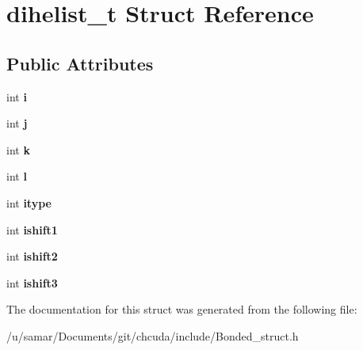 \hypertarget{structdihelist__t}{}\section{dihelist\+\_\+t Struct Reference}
\label{structdihelist__t}
\subsection*{Public Attributes}
\begin{DoxyCompactItemize}
\item 
\hypertarget{structdihelist__t_ae8623fd40d55f8dffc0f6daf5a5a6bd7}{}\label{structdihelist__t_ae8623fd40d55f8dffc0f6daf5a5a6bd7} 
int {\bfseries i}
\item 
\hypertarget{structdihelist__t_a898323e38eee50f4627c82339b1d2915}{}\label{structdihelist__t_a898323e38eee50f4627c82339b1d2915} 
int {\bfseries j}
\item 
\hypertarget{structdihelist__t_a0b00c635d4b7a0f5934270554f96758e}{}\label{structdihelist__t_a0b00c635d4b7a0f5934270554f96758e} 
int {\bfseries k}
\item 
\hypertarget{structdihelist__t_a5e8e8adcfa59f5c1654ba2f5a589ce33}{}\label{structdihelist__t_a5e8e8adcfa59f5c1654ba2f5a589ce33} 
int {\bfseries l}
\item 
\hypertarget{structdihelist__t_af7c7f060c0b0674c6721c05bac090030}{}\label{structdihelist__t_af7c7f060c0b0674c6721c05bac090030} 
int {\bfseries itype}
\item 
\hypertarget{structdihelist__t_a3bc13b8f7ee08812e3cab31e37bec002}{}\label{structdihelist__t_a3bc13b8f7ee08812e3cab31e37bec002} 
int {\bfseries ishift1}
\item 
\hypertarget{structdihelist__t_a12d9bc73a51be26d49791cf9c9073fee}{}\label{structdihelist__t_a12d9bc73a51be26d49791cf9c9073fee} 
int {\bfseries ishift2}
\item 
\hypertarget{structdihelist__t_a3eae50b602d4ffb3402ab1162276853d}{}\label{structdihelist__t_a3eae50b602d4ffb3402ab1162276853d} 
int {\bfseries ishift3}
\end{DoxyCompactItemize}


The documentation for this struct was generated from the following file\+:\begin{DoxyCompactItemize}
\item 
/u/samar/\+Documents/git/chcuda/include/Bonded\+\_\+struct.\+h\end{DoxyCompactItemize}
